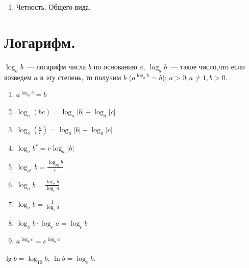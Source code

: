 \documentclass[12pt]{article}
\begin{document}
\begin{property}
\begin{enumerate}
\begin{itemize}
\begin{figure}[H]
				\end{figure}
				\item $a \in (1; \infty)$
				\begin{figure}[H]
					\centering
				\end{figure}
			\end{itemize}
			\item Четность. Общего вида.
		\end{enumerate}
	\end{property}
	\section{Логарифм.}
	\begin{definition}
		$\log_ab$~--- логарифм числа $b$ по основанию $a$. $\log_ab$~--- такое число,что если возведем $a$ в эту степень, то получим $b$ ($a^{\log_ab} = b$); $a > 0, a\not=1, b > 0$.
	\end{definition}
	\begin{property}
		\begin{enumerate}
			\item $a^{\log_ab} = b$
			\item $\log_a(bc) = \log_a|b| + \log_a|c|$
			\item $\log_a(\frac{b}{c}) = \log_a|b| - \log_a|c|$
			\item $\log_ab^r = r\log_a|b|$
			\item $\log_{a^r}b = \frac{\log_{|a|}b}{r}$
			\item $\log_ab = \frac{\log_cb}{\log_ca}$
			\item $\log_ab = \frac{1}{\log_ba}$
			\item $\log_ab \cdot \log_ca = \log_cb$
			\item $a^{\log_bc} = c^{\log_ba}$
		\end{enumerate}
	\end{property}
	\begin{note}
		$\lg b = \log_{10}b$, $\ln b = \log_{e}b$.
	\end{note}
\end{document}
